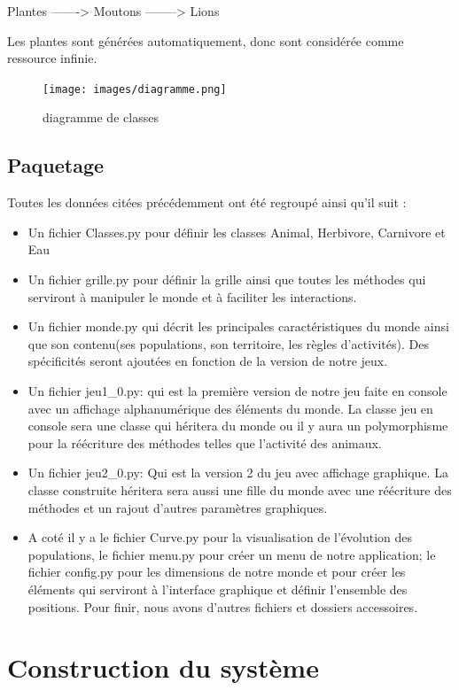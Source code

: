 \documentclass[a4paper,12pt]{article} %
\begin{document}
   Plantes -------> Moutons --------> Lions
  
Les plantes sont générées automatiquement, donc sont considérée comme ressource infinie.

\begin{figure}[h]
    \centering
    \texttt{[image: images/diagramme.png]}
    \caption{diagramme de classes}
\end{figure}

\subsection{Paquetage}
Toutes les données citées précédemment ont été regroupé ainsi qu'il suit :
\begin{itemize}
    \item Un fichier Classes.py pour définir les classes Animal, Herbivore, Carnivore et Eau
    \item Un fichier grille.py pour définir la grille ainsi que toutes les méthodes qui serviront à manipuler le monde et à faciliter les interactions.
    \item Un fichier monde.py qui décrit les principales caractéristiques du monde ainsi que son contenu(ses populations, son territoire, les règles d'activités). Des spécificités seront ajoutées en fonction de la version de notre jeux.
    \item Un fichier jeu1\_0.py: qui est la première version de notre jeu faite en console avec un affichage alphanumérique des éléments du monde. La classe jeu en console sera une classe qui héritera du monde ou il y aura un polymorphisme pour la réécriture des méthodes telles que l'activité des animaux.
    \item Un fichier jeu2\_0.py: Qui est la version 2 du jeu avec affichage graphique. La classe construite héritera sera aussi une fille du monde avec une réécriture des méthodes et un rajout d'autres paramètres graphiques.
    \item A coté il y a le fichier Curve.py pour la visualisation de l'évolution des populations, le fichier menu.py pour créer un menu de notre application; le fichier config.py pour les dimensions de notre monde et pour créer les éléments qui serviront à l'interface graphique et définir l'ensemble des positions. Pour finir, nous avons d'autres fichiers et dossiers accessoires. 
\end{itemize}

\section{Construction du système}
\end{document}
